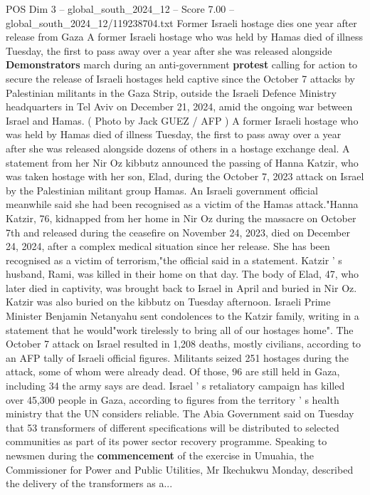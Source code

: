 \begin{textsample}{POS Dim 3 – global\_south\_2024\_12 – Score 7.00 – global\_south\_2024\_12/119238704.txt}  \label{ex:f3_pos_390}
Former Israeli hostage dies one year after release from Gaza A former Israeli hostage who was held by Hamas died of illness Tuesday, the first to pass away over a year after she was released alongside \textbf{Demonstrators} march during an anti-government \textbf{protest} calling for action to secure the release of Israeli hostages held captive since the October 7 attacks by Palestinian militants in the Gaza Strip, outside the Israeli Defence Ministry headquarters in Tel Aviv on December 21, 2024, amid the ongoing war between Israel and Hamas. ( Photo by Jack GUEZ / AFP ) A former Israeli hostage who was held by Hamas died of illness Tuesday, the first to pass away over a year after she was released alongside dozens of others in a hostage exchange deal.
A statement from her Nir Oz kibbutz announced the passing of Hanna Katzir, who was taken hostage with her son, Elad, during the October 7, 2023 attack on Israel by the Palestinian militant group Hamas.
An Israeli government official meanwhile said she had been recognised as a victim of the Hamas attack."Hanna Katzir, 76, kidnapped from her home in Nir Oz during the massacre on October 7th and released during the ceasefire on November 24, 2023, died on December 24, 2024, after a complex medical situation since her release.
She has been recognised as a victim of terrorism,"the official said in a statement.
Katzir ' s husband, Rami, was killed in their home on that day.
The body of Elad, 47, who later died in captivity, was brought back to Israel in April and buried in Nir Oz.
Katzir was also buried on the kibbutz on Tuesday afternoon.
Israeli Prime Minister Benjamin Netanyahu sent condolences to the Katzir family, writing in a statement that he would"work tirelessly to bring all of our hostages home".
The October 7 attack on Israel resulted in 1,208 deaths, mostly civilians, according to an AFP tally of Israeli official figures.
Militants seized 251 hostages during the attack, some of whom were already dead.
Of those, 96 are still held in Gaza, including 34 the army says are dead.
Israel ' s retaliatory campaign has killed over 45,300 people in Gaza, according to figures from the territory ' s health ministry that the UN considers reliable.
The Abia Government said on Tuesday that 53 transformers of different specifications will be distributed to selected communities as part of its power sector recovery programme.
Speaking to newsmen during the \textbf{commencement} of the exercise in Umuahia, the Commissioner for Power and Public Utilities, Mr Ikechukwu Monday, described the delivery of the transformers as a...

\end{textsample}
